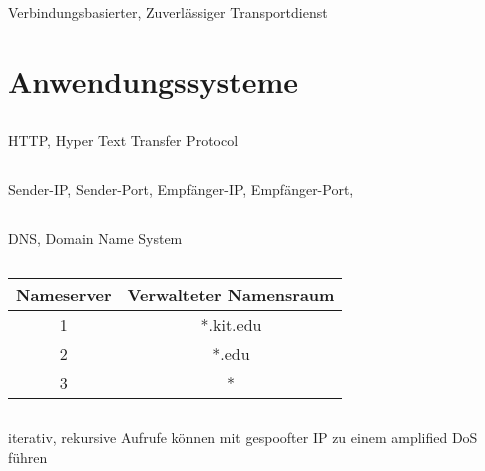 \documentclass[a4paper]{article}
\begin{document}
\subsection{}
Verbindungsbasierter, Zuverlässiger Transportdienst
\pagebreak
\section{Anwendungssysteme}
\subsection{}
HTTP, Hyper Text Transfer Protocol
\subsection{}
Sender-IP, Sender-Port, Empfänger-IP, Empfänger-Port, 
\subsection{}
DNS, Domain Name System
\subsection{}
\begin{tabular}{|c|c|}\hline
Nameserver & Verwalteter Namensraum \\ \hline
1 & *.kit.edu\\ \hline
2 & *.edu\\ \hline
3 & *\\ \hline
\end{tabular}
\subsection{}
iterativ, rekursive Aufrufe können mit gespoofter IP zu einem amplified DoS führen
\end{document}

